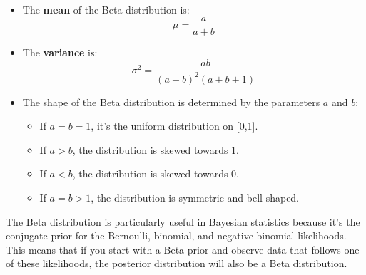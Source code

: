 \documentclass{article}
\begin{document}
\begin{itemize}
  \item The \textbf{mean} of the Beta distribution is:
  \[ \mu = \frac{a}{a+b} \]
  
  \item The \textbf{variance} is:
  \[ \sigma^2 = \frac{ab}{(a+b)^2(a+b+1)} \]

  \item The shape of the Beta distribution is determined by the parameters \( a \) and \( b \):
  \begin{itemize}
    \item If \( a = b = 1 \), it's the uniform distribution on [0,1].
    \item If \( a > b \), the distribution is skewed towards 1.
    \item If \( a < b \), the distribution is skewed towards 0.
    \item If \( a = b > 1 \), the distribution is symmetric and bell-shaped.
  \end{itemize}
\end{itemize}
The Beta distribution is particularly useful in Bayesian statistics because it's the conjugate prior for the Bernoulli, binomial, and negative binomial likelihoods. This means that if you start with a Beta prior and observe data that follows one of these likelihoods, the posterior distribution will also be a Beta distribution.
\end{document}
